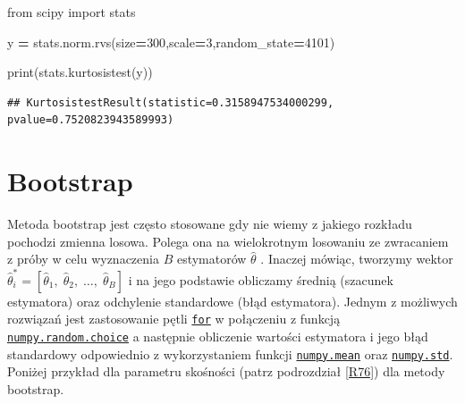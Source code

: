 \documentclass[polish,]{book}
\newenvironment{Shaded}{\begin{snugshade}}{\end{snugshade}}
\newcommand{\BuiltInTok}[1]{#1}
\newcommand{\DecValTok}[1]{\textcolor[rgb]{0.00,0.00,0.81}{#1}}
\newcommand{\ImportTok}[1]{#1}
\newcommand{\NormalTok}[1]{#1}
\newcommand{\OperatorTok}[1]{\textcolor[rgb]{0.81,0.36,0.00}{\textbf{#1}}}
\begin{document}
\begin{Shaded}
\begin{Highlighting}[]
\ImportTok{from}\NormalTok{ scipy }\ImportTok{import}\NormalTok{ stats}

\NormalTok{y }\OperatorTok{=}\NormalTok{ stats.norm.rvs(size}\OperatorTok{=}\DecValTok{300}\NormalTok{,scale}\OperatorTok{=}\DecValTok{3}\NormalTok{,random_state}\OperatorTok{=}\DecValTok{4101}\NormalTok{)}

\BuiltInTok{print}\NormalTok{(stats.kurtosistest(y))}
\end{Highlighting}
\end{Shaded}

\begin{verbatim}
## KurtosistestResult(statistic=0.3158947534000299, pvalue=0.7520823943589993)
\end{verbatim}

\hypertarget{R78}{%
\section{Bootstrap}\label{R78}}

Metoda bootstrap jest często stosowane gdy nie wiemy z jakiego rozkładu pochodzi zmienna losowa. Polega ona na wielokrotnym losowaniu ze zwracaniem z próby w celu wyznaczenia \(B\) estymatorów \(\hat{\theta}\) . Inaczej mówiąc, tworzymy wektor \(\hat{\theta}^*_{i}=[\hat{\theta}_1,\;\hat{\theta}_2,\;\dots,\;\hat{\theta}_B]\)
i na jego podstawie obliczamy średnią (szacunek estymatora) oraz odchylenie standardowe (błąd estymatora). Jednym z możliwych rozwiązań jest zastosowanie pętli \href{https://wiki.python.org/moin/ForLoop}{\texttt{for}} w połączeniu z funkcją \href{https://het.as.utexas.edu/HET/Software/Numpy/reference/generated/numpy.random.choice.html}{\texttt{numpy.random.choice}} a następnie obliczenie wartości estymatora i jego błąd standardowy odpowiednio z wykorzystaniem funkcji \href{https://docs.scipy.org/doc/numpy/reference/generated/numpy.mean.html}{\texttt{numpy.mean}} oraz \href{https://docs.scipy.org/doc/numpy/reference/generated/numpy.std.html}{\texttt{numpy.std}}.
Poniżej przykład dla parametru skośności (patrz podrozdział \ref{R76}) dla metody bootstrap.
\end{document}
